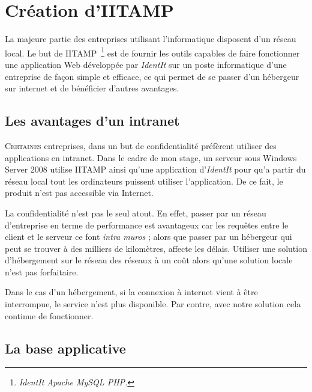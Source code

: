 \chapter{Création d'IITAMP} %
\label{cha:Création d'IITAMP}

\begin{it}

  La majeure partie des entreprises utilisant l'informatique disposent
  d'un réseau local. Le but de IITAMP\, \footnote{\emph{IdentIt Apache
  MySQL PHP.}} est de fournir les outils capables de faire fonctionner
  une application Web développée par \emph{IdentIt} sur un poste
  informatique d'une entreprise de façon simple et efficace, ce qui
  permet de se passer d'un hébergeur sur internet et de bénéficier
  d'autres avantages.

\end{it}

\section{Les avantages d'un intranet} %
\label{sec:Les avantages d'un intranet}

\lettrine{C}{ertaines} entreprises, dans un but de confidentialité
préfèrent utiliser des applications en intranet. Dans le cadre de mon
stage, un serveur sous Windows Server 2008 utilise IITAMP ainsi qu'une
application d'\emph{IdentIt} pour qu'a partir du réseau local tout les
ordinateurs puissent utiliser l'application. De ce fait, le produit
n'est pas accessible via Internet.

La confidentialité n'est pas le seul atout. En effet, passer par un
réseau d'entreprise en terme de performance est avantageux car les
requêtes entre le client et le serveur ce font \emph{intra muros} ;
alors que passer par un hébergeur qui peut se trouver à des milliers de
kilomètres, affecte les délais. Utiliser une solution d'hébergement sur
le réseau des réseaux à un coût alors qu'une solution locale n'est pas
forfaitaire.

Dans le cas d'un hébergement, si la connexion à internet vient à être
interrompue, le service n'est plus disponible. Par contre, avec notre
solution cela continue de fonctionner.

\section{La base applicative} %
\label{sec:La base applicative}


